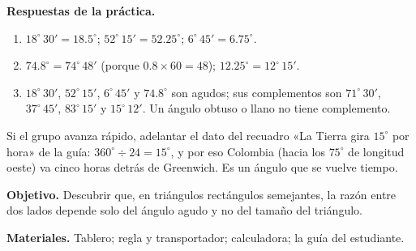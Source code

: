\documentclass[11pt]{article}
\begin{document}
\textbf{Respuestas de la práctica.}
\begin{enumerate}
  \item $18^\circ\,30' = \num{18,5}^\circ$; \quad $52^\circ\,15' = \num{52,25}^\circ$;
    \quad $6^\circ\,45' = \num{6,75}^\circ$.
  \item $\num{74,8}^\circ = 74^\circ\,48'$ (porque $\num{0,8}\times 60 = 48$); \quad
    $\num{12,25}^\circ = 12^\circ\,15'$.
  \item $18^\circ\,30'$, $52^\circ\,15'$, $6^\circ\,45'$ y $\num{74,8}^\circ$ son agudos;
    sus complementos son $71^\circ\,30'$, $37^\circ\,45'$, $83^\circ\,15'$ y
    $15^\circ\,12'$. Un ángulo obtuso o llano no tiene complemento.
\end{enumerate}

\begin{nota}
Si el grupo avanza rápido, adelantar el dato del recuadro «La Tierra gira $15^\circ$ por
hora» de la guía: $360^\circ \div 24 = 15^\circ$, y por eso Colombia (hacia los $75^\circ$
de longitud oeste) va cinco horas detrás de Greenwich. Es un ángulo que se vuelve tiempo.
\end{nota}


\textbf{Objetivo.} Descubrir que, en triángulos rectángulos semejantes, la razón entre dos
lados depende solo del ángulo agudo y no del tamaño del triángulo.

\textbf{Materiales.} Tablero; regla y transportador; calculadora; la guía del estudiante.
\end{document}
